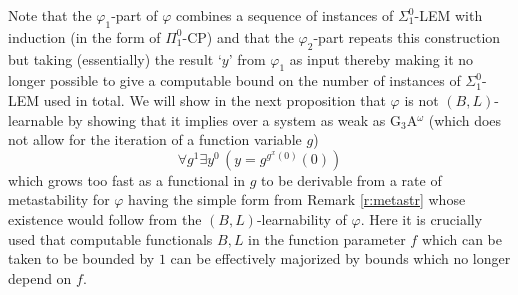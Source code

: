 Note that the $\varphi_1$-part of $\varphi$ combines a sequence of instances 
of $\Sigma^0_1$-LEM with induction (in the form of $\Pi^0_1$-CP) and that the 
$\varphi_2$-part repeats this construction but taking (essentially) the result 
`$y$' from $\varphi_1$ as input thereby making it no longer possible to give 
a computable bound on the number of instances of $\Sigma^0_1$-LEM used in 
total. We 
will show in the next proposition that $\varphi$ is not $(B,L)$-learnable 
by showing that it implies over a system as weak as 
G$_3$A$^{\omega}$ (which does not allow for the iteration of a function 
variable $g$) 
\[ \forall g^1\exists y^0 \,(y=g^{g^x(0)}(0)) \] 
which grows too fast as a functional in $g$ to be derivable from a rate 
of metastability for $\varphi$ having the simple form from Remark 
\ref{r:metastr} whose existence would follow from the $(B,L)$-learnability 
of $\varphi.$  
Here it is crucially used that computable functionals $B,L$ in the function 
parameter $f$ which can be taken to be bounded by $1$ can be effectively 
majorized by bounds which no longer depend on $f.$


